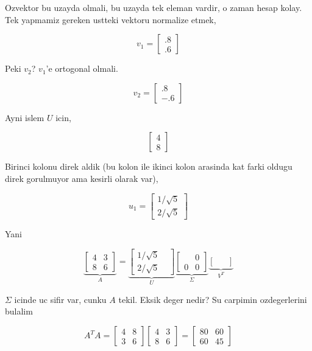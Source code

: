 \documentclass[12pt,fleqn]{article}\usepackage{../common}
\begin{document}
Ozvektor bu uzayda olmali, bu uzayda tek eleman vardir, o zaman hesap
kolay. Tek yapmamiz gereken ustteki vektoru normalize etmek, 

\[ 
v_1 = \left[\begin{array}{r}
.8 \\ .6
\end{array}\right]
 \]

Peki $v_2$? $v_1$'e ortogonal olmali. 

\[ 
v_2 = \left[\begin{array}{r}
.8 \\ -.6
\end{array}\right]
 \]

Ayni islem $U$ icin,

\[ 
\left[\begin{array}{r}
4 \\ 8
\end{array}\right]
 \]

Birinci kolonu direk aldik (bu kolon ile ikinci kolon arasinda kat
farki oldugu direk gorulmuyor ama kesirli olarak var),

\[ 
u_1 = \left[\begin{array}{r}
1/\sqrt{ 5} \\ 2/\sqrt{ 5}
\end{array}\right]
 \]

Yani

\[ 
\underbrace{
\left[\begin{array}{rr}
4 & 3 \\ 8 & 6
\end{array}\right] 
}_{A}
=
\underbrace{
\left[\begin{array}{rr}
1/\sqrt{ 5} &  \\ 2/\sqrt{ 5} & 
\end{array}\right]
}_{U}
\underbrace{
\left[\begin{array}{rr}
 & 0 \\ 0 & 0
\end{array}\right]
}_{\Sigma}
\underbrace{
\left[\begin{array}{rr}
 & \\
 & 
\end{array}\right]
}_{V^T}
 \]

$\Sigma$ icinde uc sifir var, cunku $A$ tekil. Eksik deger nedir? Su
carpimin ozdegerlerini bulalim

\[ A^TA = 
\left[\begin{array}{rr}
4 & 8 \\ 3 & 6
\end{array}\right] 
\left[\begin{array}{rr}
4 & 3 \\ 8 & 6
\end{array}\right] =
\left[\begin{array}{rr}
80 & 60 \\ 60 & 45
\end{array}\right] 
 \]
\end{document}
